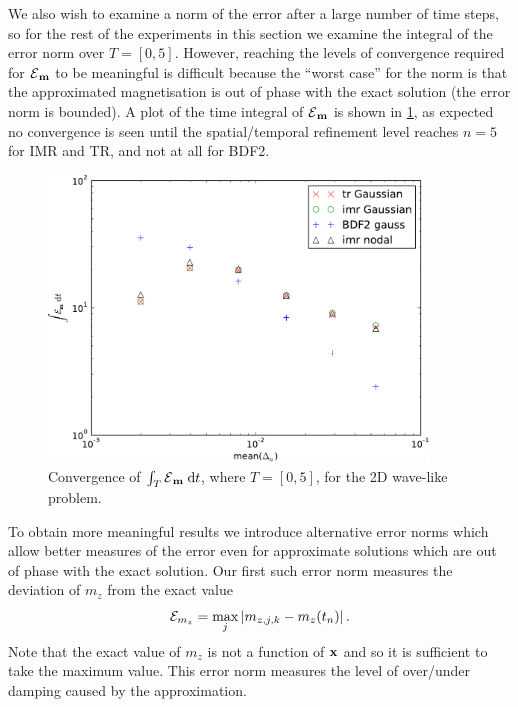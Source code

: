 We also wish to examine a norm of the error after a large number of time steps, so for the rest of the experiments in this section we examine the integral of the error norm over $T = [0, 5]$.
However, reaching the levels of convergence required for $\mathcal{E}{}_{\boldsymbol{\mathrm{m}}}$ to be meaningful is difficult because the ``worst case'' for the norm is that the approximated magnetisation is out of phase with the exact solution (\ie the error norm is bounded).
A plot of the time integral of $\mathcal{E}{}_{\boldsymbol{\mathrm{m}}}$ is shown in \cref{fig:convergence-long-time-full-norm}, as expected no convergence is seen until the spatial/temporal refinement level reaches $n=5$ for IMR and TR, and not at all for BDF2.
\begin{figure}
  \centering
  \includegraphics[width=0.9\textwidth]{plots/2d_wave_solution_convergence_long_time/errornormintegralvsmeanofdts.pdf}
  \caption{Convergence of ${\int_T {\mathcal{E}{}_{\boldsymbol{\mathrm{m}}}} {\; \mathrm{{d}}} t}$, where $T=[0,5]$, for the 2D wave-like problem.
  }
  \label{fig:convergence-long-time-full-norm}
\end{figure}

To obtain more meaningful results we introduce alternative error norms which allow better measures of the error even for approximate solutions which are out of phase with the exact solution.
Our first such error norm measures the deviation of $m_z$ from the exact value
\begin{equation}
  \mathcal{E}_{m_z} = \max_j \left|{m_{z,j,k} - m_z(t_n)} \right|.
\end{equation}
Note that the exact value of $m_z$ is not a function of $\boldsymbol{\mathrm{x}}$ and so it is sufficient to take the maximum value.
This error norm measures the level of over/under damping caused by the approximation.


